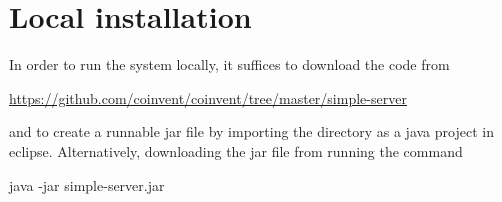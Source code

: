 \section{Local installation}

In order to run the system locally, it suffices to download the code from \mbox{}\\
\begin{center}
\url{https://github.com/coinvent/coinvent/tree/master/simple-server}
\end{center}
and to create a runnable jar file by importing the directory as a java project in eclipse. Alternatively, downloading the jar file from running the command
\begin{center}
java -jar simple-server.jar
\end{center}